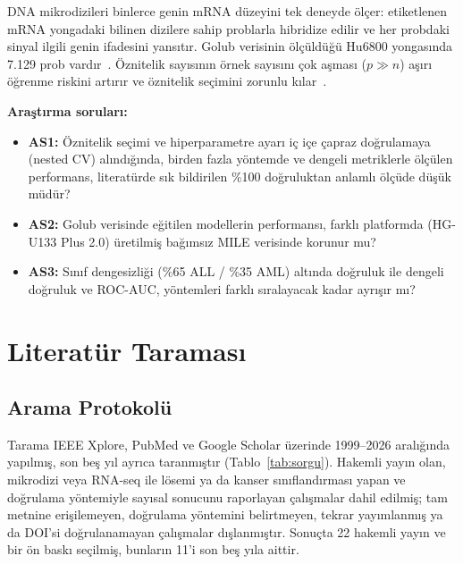 \documentclass[conference]{IEEEtran}
\begin{document}
DNA mikrodizileri binlerce genin mRNA düzeyini tek deneyde ölçer: etiketlenen mRNA yongadaki bilinen dizilere sahip problarla hibridize edilir ve her probdaki sinyal ilgili genin ifadesini yansıtır. Golub verisinin ölçüldüğü Hu6800 yongasında 7.129 prob vardır~\cite{golub1999}. Öznitelik sayısının örnek sayısını çok aşması ($p \gg n$) aşırı öğrenme riskini artırır ve öznitelik seçimini zorunlu kılar~\cite{saeys2007}.

\textbf{Araştırma soruları:}
\begin{itemize}[leftmargin=*]
  \item \textbf{AS1:} Öznitelik seçimi ve hiperparametre ayarı iç içe çapraz doğrulamaya (nested CV) alındığında, birden fazla yöntemde ve dengeli metriklerle ölçülen performans, literatürde sık bildirilen \%100 doğruluktan anlamlı ölçüde düşük müdür?
  \item \textbf{AS2:} Golub verisinde eğitilen modellerin performansı, farklı platformda (HG-U133 Plus 2.0) üretilmiş bağımsız MILE verisinde korunur mu?
  \item \textbf{AS3:} Sınıf dengesizliği (\%65 ALL / \%35 AML) altında doğruluk ile dengeli doğruluk ve ROC-AUC, yöntemleri farklı sıralayacak kadar ayrışır mı?
\end{itemize}

\section{Literatür Taraması}

\subsection{Arama Protokolü}
Tarama IEEE Xplore, PubMed ve Google Scholar üzerinde 1999--2026 aralığında yapılmış, son beş yıl ayrıca taranmıştır (Tablo~\ref{tab:sorgu}). Hakemli yayın olan, mikrodizi veya RNA-seq ile lösemi ya da kanser sınıflandırması yapan ve doğrulama yöntemiyle sayısal sonucunu raporlayan çalışmalar dahil edilmiş; tam metnine erişilemeyen, doğrulama yöntemini belirtmeyen, tekrar yayımlanmış ya da DOI'si doğrulanamayan çalışmalar dışlanmıştır. Sonuçta 22 hakemli yayın ve bir ön baskı seçilmiş, bunların 11'i son beş yıla aittir.
\end{document}

